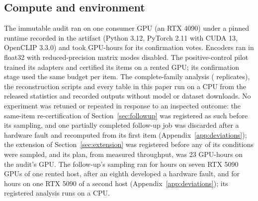 \subsection{Compute and environment}

The immutable audit ran on one consumer GPU (an RTX 4090) under a pinned
runtime recorded in the artifact (Python 3.12, PyTorch 2.11 with CUDA 13,
OpenCLIP 3.3.0) and took \ExpElapsedHours{} GPU-hours for its \ExpConfVotes{}
confirmation votes. Encoders ran in float32 with reduced-precision matrix modes
disabled. The positive-control pilot trained its adapters and certified its
items on a rented GPU; its confirmation stage used the same budget per item.
The complete-family analysis (\BandReplicates{} replicates), the reconstruction
scripts and every table in this paper run on a CPU from the released
statistics and recorded outputs without model or dataset downloads. No experiment was
retuned or repeated in response to an inspected outcome: the same-item
re-certification of Section~\ref{sec:followup} was registered as such before its
sampling, and one partially completed follow-up job was discarded after a
hardware fault and recomputed from its first item (Appendix~\ref{app:deviations}); the extension of Section~\ref{sec:extension} was
registered before any of its conditions were sampled, and its plan, from
measured throughput, was 23 GPU-hours on the audit's GPU. The follow-up's sampling ran for
\FUMainHours{} hours on seven RTX 5090 GPUs of one rented host, after an eighth
developed a hardware fault, and for \FUExtraHours{} hours on one RTX 5090 of a
second host (Appendix~\ref{app:deviations}); its registered analysis runs on a
CPU.
